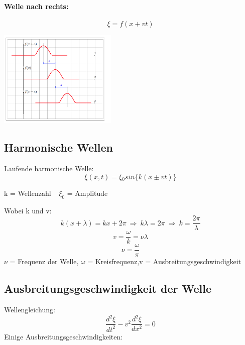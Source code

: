 \documentclass[7pt]{article}
\begin{document}
\begin{multicols*}{3}
\paragraph{Welle nach rechts:}
\begin{equation*}
\xi = f(x+vt) 
\end{equation*}
\begin{center}
	\includegraphics[width=160pt]{images/wellenrichtung.png}
\end{center}

\columnbreak


\subsection{Harmonische Wellen}
Laufende harmonische Welle:
\begin{equation*}
\xi(x,t) = \xi {_0} sin\lbrace k(x\pm vt) \rbrace
\end{equation*}

k = Wellenzahl $\> \>$ 
$\xi_0$ = Amplitude\newline
\newline

Wobei k und v:
\begin{equation*}
k(x+\lambda) = kx + 2\pi \> \Longrightarrow  \> k\lambda = 2\pi \> \Longrightarrow \> k = \frac{2\pi}{\lambda}
\end{equation*}
\begin{equation*}
v = \frac{\omega}{k} = \nu\lambda
\end{equation*}
\begin{equation*}
\nu = \frac{\omega}{\pi}
\end{equation*}
$\nu$ = Frequenz der Welle, $\omega$ = Kreisfrequenz,\newline v = Ausbreitungsgeschwindigkeit



\subsection{Ausbreitungsgeschwindigkeit der Welle}
Wellengleichung:
\begin{equation*}
\frac{d^2\xi}{dt^2} - v^2\frac{d^2\xi}{dx^2} = 0 
\end{equation*}
\newline
Einige Ausbreitungsgeschwindigkeiten:


\end{multicols*}
\end{document}
